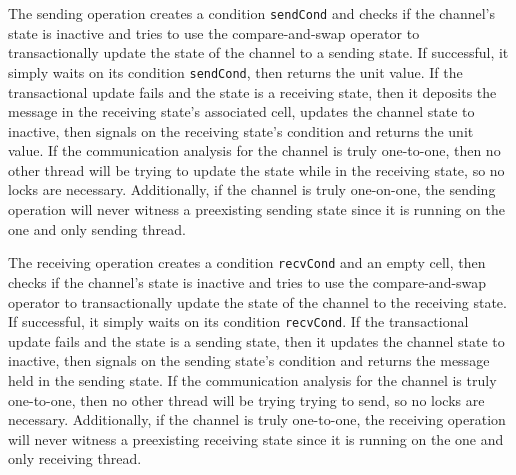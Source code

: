 \documentclass[letterpaper, 11pt]{extarticle}
\begin{document}
The sending operation creates a condition \lstinline{sendCond} and checks
if the channel's state is inactive and tries to use the
compare-and-swap operator to transactionally update the state of the channel to a
sending state.
If successful, it simply waits on its condition \lstinline{sendCond}, then returns the unit value.
If the transactional update fails and the state is a receiving state,
then it deposits the message in the receiving state's associated cell,
updates the channel state to inactive, then signals on the receiving state's 
condition and returns the unit value.
If the communication analysis for the channel is
truly one-to-one, then no other thread will be trying to update the state while in
the receiving state, so no locks are necessary.
Additionally, if the channel is truly one-on-one, the sending operation will never
witness a preexisting sending state since it is running on the one and only sending thread. 

The receiving operation creates a condition \lstinline{recvCond} and an empty cell,
then checks if the channel's state is inactive and tries to use the
compare-and-swap operator to transactionally update the state of the channel to
the receiving state.  If successful, it simply waits on its condition \lstinline{recvCond}.
If the transactional update fails and the state is a sending state,
then it updates the channel state to inactive, then signals on the sending state's
condition and returns the message held in the sending state.
If the communication
analysis for the channel is truly one-to-one, then no other thread will be trying
trying to send, so no locks are necessary.
Additionally, if the channel is truly one-to-one, the receiving operation will never
witness a preexisting receiving state since it is running on the one and only receiving thread.
\end{document}
